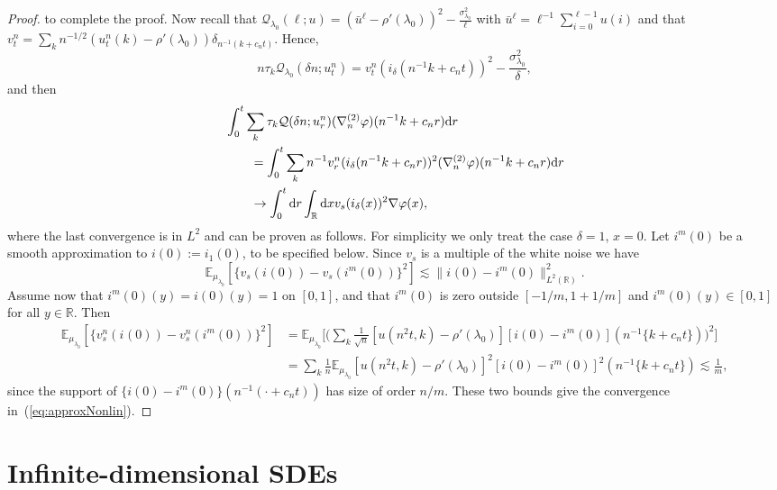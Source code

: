 \documentclass[11pt, a4paper]{article}
\newcommand{\assign}{:=}
\newcommand{\mathd}{\mathrm{d}}
\newcommand{\CQ}{\mathscr{Q}}
\newcommand{\1}{\mathbf{1}}
\begin{document}
\begin{proof}
  to complete the proof. Now recall that $\CQ_{\lambda_0} (\ell ; u) =
  (\bar{u}^{\ell} - \rho' (\lambda_0))^2 - \frac{\sigma^2_{\lambda_0}}{\ell}$
  with $\bar{u}^{\ell} = \ell^{- 1} \sum_{i = 0}^{\ell - 1} u (i)$ and that $v^n_t = \sum_k n^{- 1 / 2} (u^n_t (k) - \rho' (\lambda_0)) \delta_{n^{-
     1} (k + c_n t)}$.
  Hence,
  \[ n \tau_k \mathcal{Q}_{\lambda_0} (\delta n ; u^n_t) = v^n_t
     (i_{\delta} (n^{- 1} k + c_n t))^2 -
     \frac{\sigma^2_{\lambda_0}}{\delta}, \]
  and then
  \begin{align}
     &\int_0^t  \sum_k \tau_k \mathcal{Q} (\delta n ; u^n_r) (\nabla^{(2)}_n \varphi) (n^{- 1} k + c_n r) \mathd r\notag \\
     &\qquad = \int_0^t \sum_k n^{- 1} v^n_r (i_{\delta} (n^{- 1} k + c_n r))^2 (\nabla^{(2)}_n \varphi) (n^{- 1} k + c_n r) \mathd r\notag \\
     &\qquad \rightarrow \int_0^t \mathd r \int_{\mathbb{R}} \mathd x v_s (i_{\delta} (x))^2 \nabla \varphi (x), \label{eq:approxNonlin} 
  \end{align}
  where the last convergence is in $L^2$ and can be proven as follows. For
  simplicity we only treat the case $\delta = 1$, $x = 0$. Let $i_{}^m
  (0)$ be a smooth approximation to $i (0) \assign i_1 (0)$, to be specified below. Since $v_s$ is a multiple of the white noise we have
  \[ \mathbb{E}_{{\mu}_{\lambda_0}} [\{ v_s (i_{} (0)) - v_s (i_{}^m (0))
     \}^2] \lesssim \| i_{} (0) - i_{}^m (0) \|_{L^2 (\mathbb{R})}^2 . \]
  Assume now that $i^m (0) (y) = i (0) (y) = 1$ on $[0, 1]$, and that $i^m
  (0)$ is zero outside $[- 1 / m, 1 + 1 / m]$ and $i^m (0) (y) \in [0, 1]$ for
  all $y \in \mathbb{R}$. Then
     \begin{align*}
   \mathbb{E}_{{\mu}_{\lambda_0}} [\{ v^n_s (i_{} (0)) - v^n_s (i_{}^m
   (0)) \}^2]
   &= \mathbb{E}_{{\mu}_{\lambda_0}} \Big[ \Big( \sum_k
   \frac{1}{\sqrt{n}} [u (n^2 t, k) - \rho' (\lambda_0)] [i (0) - i^m (0)]
   (n^{- 1} \{ k + c_n t \}) \Big)^2 \Big] \\
   &= \sum_k \frac{1}{n} \mathbb{E}_{{\mu}_{\lambda_0}} [u (n^2 t, k) -
     \rho' (\lambda_0)]^2 [i (0) - i^m (0)]^2 (n^{- 1} \{ k + c_n t \})
     \lesssim \frac{1}{m},
     \end{align*}
  since the support of $\{ i (0) - i^m (0) \} (n^{- 1} (\cdot + c_n t))$ has
  size of order $n / m$. These two bounds give the convergence
  in~(\ref{eq:approxNonlin}).
\end{proof}

\appendix\section{Infinite-dimensional SDEs}\label{app:periodic approximation}
\end{document}
